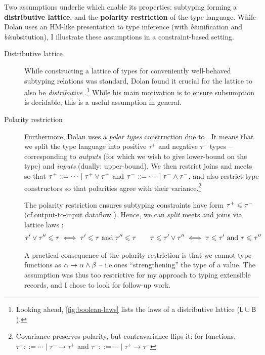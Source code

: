 Two assumptions underlie \mlsub{} which enable its properties: subtyping forming a \textbf{distributive lattice}, and the \textbf{polarity restriction} of the type language. While Dolan uses an HM-like presentation to type inference (with \emph{bi}unification and \emph{bi}subsitution), I illustrate these assumptions in a constraint-based setting. \begin{description}
    \item[Distributive lattice] While constructing a lattice of types for conveniently well-behaved subtyping relations was standard, Dolan found it crucial for the lattice to also be \emph{distributive} \cite[Section~3.2]{dolan-thesis}.\footnote{Looking ahead, \ref{fig:boolean-laws} lists the laws of a distributive lattice ($\mathsf L \cup \mathsf B$).} While his main motivation is to ensure subsumption is decidable, this is a useful assumption in general.
    \item[Polarity restriction] Furthermore, Dolan uses a \emph{polar types} construction due to \textcite{pottier-thesis} \cite[Section~5.1]{dolan-thesis}. It means that we split the type language into positive $\tau^+$ and negative $\tau^-$ types -- corresponding to \emph{outputs} (for which we wish to give lower-bound on the type) and \emph{inputs} (dually: upper-bound). We then restrict joins and meets so that $\tau^+ ::= \cdots \mid \tau^+ \lor \tau^+$ and $\tau^- ::= \cdots \mid \tau^- \land \tau^-$,
    and also restrict type constructors so that polarities agree with their variance.\footnote{Covariance preserves polarity, but contravariance flips it: for functions, $\tau^+ ::= \cdots \mid \tau^- \to \tau^+$ and $\tau^- ::= \cdots \mid \tau^+ \to \tau^-$}
    
    The polarity restriction ensures subtyping constraints have form $\tau^+ \leqslant \tau^-$ (cf.\@ output-to-input dataflow \cite[Section~1.1]{dolan-thesis}). Hence, we can \emph{split} meets and joins via lattice laws \cite{simple-sub}: 
    \begin{align*}
        \tau' \lor \tau'' \leqslant \tau \iff \tau' \leqslant \tau \text{ and } \tau'' \leqslant \tau \qquad
        \tau \leqslant \tau' \lor \tau'' \iff \tau \leqslant \tau' \text{ and } \tau \leqslant \tau''
    \end{align*}

    A practical consequence of the polarity restriction is that we cannot type functions as $\alpha \to \alpha \land \beta$ -- i.e.\@ ones \enquote{strengthening} the type of a value. The assumption was thus too restrictive for my approach to typing extensible records, and I chose to look for follow-up work. 
\end{description}


